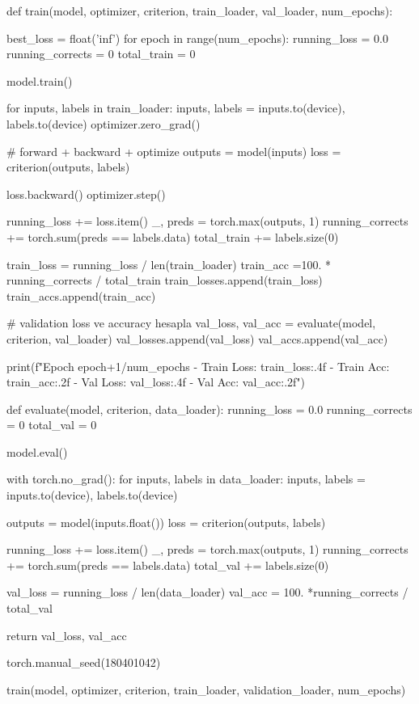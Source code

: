 \documentclass[11pt]{article}
\begin{document}
\begin{python}
def train(model, optimizer, criterion, train_loader, val_loader, num_epochs):

    best_loss = float('inf')
    for epoch in range(num_epochs):
        running_loss = 0.0
        running_corrects = 0
        total_train = 0
        
        model.train() 
        
        for inputs, labels in train_loader:
            inputs, labels = inputs.to(device), labels.to(device)
            optimizer.zero_grad() 
            
            # forward + backward + optimize
            outputs = model(inputs)
            loss = criterion(outputs, labels)
            
          
            
            loss.backward()
            optimizer.step()
            
            running_loss += loss.item()
            _, preds = torch.max(outputs, 1)
            running_corrects += torch.sum(preds == labels.data)
            total_train += labels.size(0)
            
        train_loss = running_loss / len(train_loader)
        train_acc =100. * running_corrects / total_train
        train_losses.append(train_loss)
        train_accs.append(train_acc)
        
        # validation loss ve accuracy hesapla
        val_loss, val_acc = evaluate(model, criterion, val_loader)
        val_losses.append(val_loss)
        val_accs.append(val_acc)
        
       
        print(f"Epoch {epoch+1}/{num_epochs} - Train Loss: {train_loss:.4f} - Train Acc: {train_acc:.2f} - Val Loss: {val_loss:.4f} - Val Acc: {val_acc:.2f}")

def evaluate(model, criterion, data_loader):
    running_loss = 0.0
    running_corrects = 0
    total_val = 0

    model.eval() 

    with torch.no_grad(): 
        for inputs, labels in data_loader:
            inputs, labels = inputs.to(device), labels.to(device)

            outputs = model(inputs.float())
            loss = criterion(outputs, labels)

            running_loss += loss.item()
            _, preds = torch.max(outputs, 1)
            running_corrects += torch.sum(preds == labels.data)
            total_val += labels.size(0)

    val_loss = running_loss / len(data_loader)
    val_acc = 100. *running_corrects / total_val

    return val_loss, val_acc

    
torch.manual_seed(180401042)

train(model, optimizer, criterion, train_loader, validation_loader, num_epochs)

        
\end{python}
\end{document}
